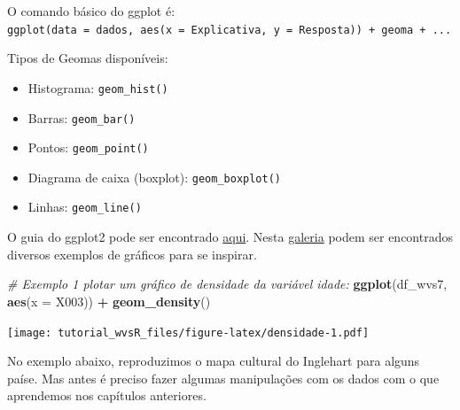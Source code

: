 \documentclass[
  brazil,
]{book}
\newenvironment{Shaded}{\begin{snugshade}}{\end{snugshade}}
\newcommand{\CommentTok}[1]{\textcolor[rgb]{0.56,0.35,0.01}{\textit{#1}}}
\newcommand{\DataTypeTok}[1]{\textcolor[rgb]{0.13,0.29,0.53}{#1}}
\newcommand{\KeywordTok}[1]{\textcolor[rgb]{0.13,0.29,0.53}{\textbf{#1}}}
\newcommand{\NormalTok}[1]{#1}
\newcommand{\OperatorTok}[1]{\textcolor[rgb]{0.81,0.36,0.00}{\textbf{#1}}}
\newcommand{\StringTok}[1]{\textcolor[rgb]{0.31,0.60,0.02}{#1}}
\providecommand{\tightlist}{%
  \setlength{\itemsep}{0pt}\setlength{\parskip}{0pt}}
\begin{document}
O comando básico do ggplot é: \texttt{ggplot(data\ =\ dados,\ aes(x\ =\ Explicativa,\ y\ =\ Resposta))\ +\ geoma\ +\ ...}

Tipos de Geomas disponíveis:

\begin{itemize}
\tightlist
\item
  Histograma: \texttt{geom\_hist()}
\item
  Barras: \texttt{geom\_bar()}
\item
  Pontos: \texttt{geom\_point()}
\item
  Diagrama de caixa (boxplot): \texttt{geom\_boxplot()}
\item
  Linhas: \texttt{geom\_line()}
\end{itemize}

O guia do ggplot2 pode ser encontrado \href{https://ggplot2.tidyverse.org/index.html}{aqui}. Nesta \href{https://www.r-graph-gallery.com/}{galeria} podem ser encontrados diversos exemplos de gráficos para se inspirar.

\begin{Shaded}
\begin{Highlighting}[]
\CommentTok{# Exemplo 1 plotar um gráfico de densidade da variável idade: }
\KeywordTok{ggplot}\NormalTok{(df_wvs7, }\KeywordTok{aes}\NormalTok{(}\DataTypeTok{x =}\NormalTok{ X003)) }\OperatorTok{+}\StringTok{ }\KeywordTok{geom_density}\NormalTok{() }
\end{Highlighting}
\end{Shaded}

\texttt{[image: tutorial\_wvsR\_files/figure-latex/densidade-1.pdf]}

No exemplo abaixo, reproduzimos o mapa cultural do Inglehart \citep{inglehart_modernization_2005} para alguns paíse. Mas antes é preciso fazer algumas manipulações com os dados com o que aprendemos nos capítulos anteriores.
\end{document}
